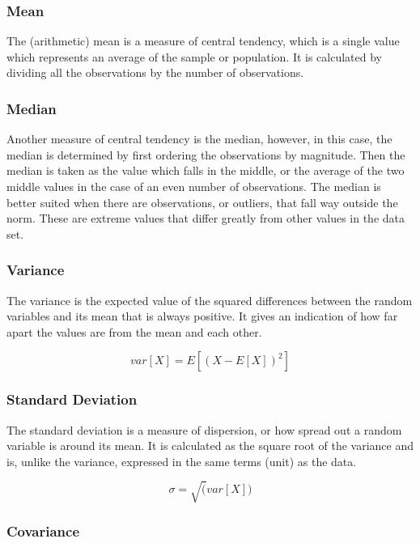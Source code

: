 \documentclass[11pt,]{article}
\begin{document}
\subsubsection{Mean}\label{mean}

The (arithmetic) mean is a measure of central tendency, which is a
single value which represents an average of the sample or population. It
is calculated by dividing all the observations by the number of
observations.

\subsubsection{Median}\label{median}

Another measure of central tendency is the median, however, in this
case, the median is determined by first ordering the observations by
magnitude. Then the median is taken as the value which falls in the
middle, or the average of the two middle values in the case of an even
number of observations. The median is better suited when there are
observations, or outliers, that fall way outside the norm. These are
extreme values that differ greatly from other values in the data set.

\subsubsection{Variance}\label{variance}

The variance is the expected value of the squared differences between
the random variables and its mean that is always positive. It gives an
indication of how far apart the values are from the mean and each other.

\[ var[X] = E[(X - E[X])^2] \]

\subsubsection{Standard Deviation}\label{standard-deviation}

The standard deviation is a measure of dispersion, or how spread out a
random variable is around its mean. It is calculated as the square root
of the variance and is, unlike the variance, expressed in the same terms
(unit) as the data.

\[ \sigma = \sqrt(var[X]) \]

\subsubsection{Covariance}\label{covariance}
\end{document}

